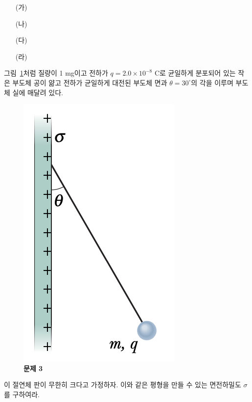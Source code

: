 \documentclass[tightenlines,floatfix,nofootinbib,superscriptaddress,fleqn]{revtex4-2}
\begin{document}
\begin{itemize}
  \item[(가)]
  \item[(나)]
  \item[(다)]
  \item[(라)] 
\end{itemize}
\vspace{0.5cm}
 그림~\ref{fig:2}처럼 질량이 1 mg이고
전하가 $q=2.0\times 10^{-8}$ C로 균일하게 분포되어 있는 작은 부도체
공이 얆고 전하가 균일하게 대전된 부도체 면과 $\theta=30^\circ$의
각을 이루며 부도체 실에 매달려 있다.  
\begin{figure}[htp]
  \centering
  \includegraphics[scale=0.6]{qfig3-2.png}
  \caption{\textbf{문제 3}}
  \label{fig:2}
\end{figure}
이 절연체 판이 무한히 크다고 가정하자. 이와 같은 평형을 만들 수 있는
면전하밀도 $\sigma$를 구하여라.
\vspace{0.5cm}


\vspace{0.5cm}
\end{document}
